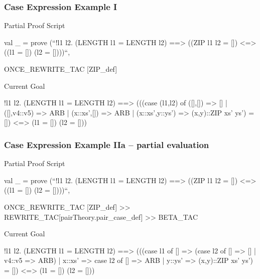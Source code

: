 \begin{frame}[fragile]
\frametitle{Case Expression Example I}

\begin{block}{Partial Proof Script}
\begin{semiverbatim}\scriptsize
val _ = prove (``!l1 l2. 
  (LENGTH l1 = LENGTH l2) ==> 
  ((ZIP l1 l2 = []) <=> ((l1 = []) \holAnd{} (l2 = [])))``,

ONCE_REWRITE_TAC [ZIP_def] 
\end{semiverbatim}
\end{block}


\begin{block}{Current Goal}
\begin{semiverbatim}\scriptsize
!l1 l2.
  (LENGTH l1 = LENGTH l2) ==>
  (((case (l1,l2) of
       ([],[]) => []
     | ([],v4::v5) => ARB
     | (x::xs',[]) => ARB
     | (x::xs',y::ys') => (x,y)::ZIP xs' ys') =
    []) <=> (l1 = []) \holAnd{} (l2 = []))
\end{semiverbatim}
\end{block}
\end{frame}

\begin{frame}[fragile]
\frametitle{Case Expression Example IIa -- partial evaluation}

\begin{block}{Partial Proof Script}
\begin{semiverbatim}\scriptsize
val _ = prove (``!l1 l2. 
  (LENGTH l1 = LENGTH l2) ==> 
  ((ZIP l1 l2 = []) <=> ((l1 = []) \holAnd{} (l2 = [])))``,

ONCE_REWRITE_TAC [ZIP_def] >>
REWRITE_TAC[pairTheory.pair_case_def] >> BETA_TAC
\end{semiverbatim}
\end{block}


\begin{block}{Current Goal}
\begin{semiverbatim}\scriptsize
!l1 l2.
  (LENGTH l1 = LENGTH l2) ==>
  (((case l1 of
       [] => (case l2 of [] => [] | v4::v5 => ARB)
     | x::xs' => case l2 of [] => ARB | y::ys' => (x,y)::ZIP xs' ys') =
    []) <=> (l1 = []) \holAnd{} (l2 = []))
\end{semiverbatim}
\end{block}
\end{frame}


